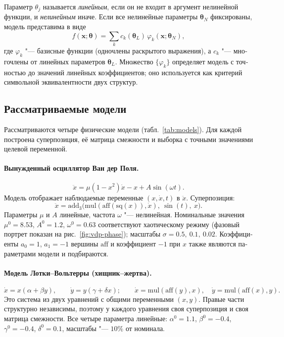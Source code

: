 \documentclass[12pt]{article}
\newif\ifhighlight \highlighttrue
\newenvironment{ru}{\begin{otherlanguage}{russian}\ifhighlight\color{blue}\fi}{\end{otherlanguage}}
\newcommand{\vx}{\mathbf{x}}
\newcommand{\tht}{\bm{\theta}}
\begin{document}
\begin{ru}
Параметр $\theta_j$ называется \emph{линейным}, если он не входит в аргумент нелинейной функции, и \emph{нелинейным} иначе. Если все нелинейные параметры $\tht_N$ фиксированы, модель представима в виде
\begin{equation}\label{eq:linearize}
f(\vx;\tht)=\sum_{k} c_k(\tht_L)\,\varphi_k(\vx;\tht_N),
\end{equation}
где $\varphi_k$ "--- базисные функции (одночлены раскрытого выражения), а $c_k$ "--- многочлены от линейных параметров $\tht_L$. Множество $\{\varphi_k\}$ определяет модель с точностью до значений линейных коэффициентов; оно используется как критерий символьной эквивалентности двух структур.

\subsection{Рассматриваемые модели}
Рассматриваются четыре физические модели (табл.~\ref{tab:models}). Для каждой построена суперпозиция, её матрица смежности и выборка с точными значениями целевой переменной.

\paragraph{Вынужденный осциллятор Ван дер Поля.}
\[
\ddot x=\mu(1-x^2)\dot x-x+A\sin(\omega t).
\]
Модель отображает наблюдаемые переменные $(x,\dot x,t)$ в $\ddot x$. Суперпозиция:
\[
\ddot x=\mathrm{add}_3\bigl(\mathrm{mul}(\mathrm{aff}(\mathrm{sq}(x)),\dot x),\ \sin(t),\ x\bigr).
\]
Параметры $\mu$ и $A$ линейные, частота $\omega$ "--- нелинейная. Номинальные значения $\mu^0=8.53$, $A^0=1.2$, $\omega^0=0.63$ соответствуют хаотическому режиму (фазовый портрет показан на рис.~\ref{fig:vdp-phase}); масштабы $\sigma=0.5,\ 0.1,\ 0.02$. Коэффициенты $a_0=1$, $a_1=-1$ вершины $\mathrm{aff}$ и коэффициент $-1$ при $x$ также являются параметрами модели и подбираются.

\paragraph{Модель Лотки--Вольтерры (хищник--жертва).}
\[
\dot x=x(\alpha+\beta y),\qquad \dot y=y(\gamma+\delta x);\qquad
\dot x=\mathrm{mul}(\mathrm{aff}(y),x),\quad \dot y=\mathrm{mul}(\mathrm{aff}(x),y).
\]
Это система из двух уравнений с общими переменными $(x,y)$. Правые части структурно независимы, поэтому у каждого уравнения своя суперпозиция и своя матрица смежности. Все четыре параметра линейные: $\alpha^0=1.1$, $\beta^0=-0.4$, $\gamma^0=-0.4$, $\delta^0=0.1$, масштабы "--- $10\%$ от номинала.


\end{ru}
\end{document}
